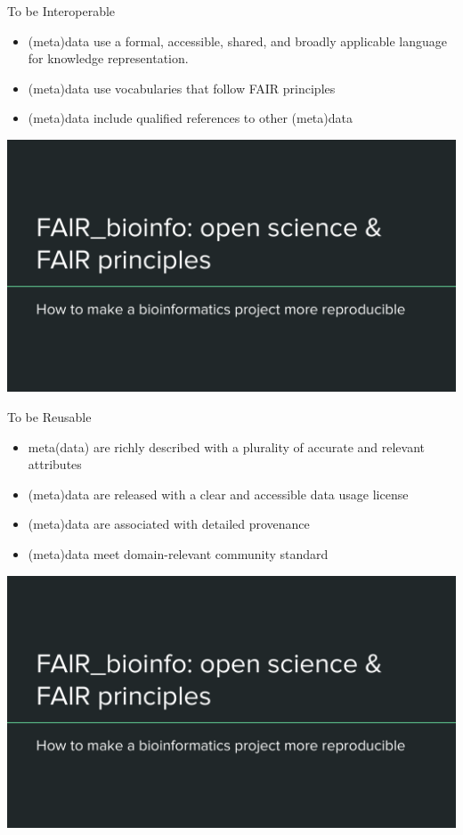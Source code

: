 \begin{frame}
\begin{block}{To be Interoperable}
\begin{itemize}
\item (meta)data use a formal, accessible, shared, and broadly applicable language for knowledge representation.
\item (meta)data use vocabularies that follow FAIR principles
\item (meta)data include qualified references to other (meta)data
\end{itemize}
\end{block}
\end{frame}

\begin{frame}
\includegraphics[page=11,scale=0.55]{01_OS_and_FAIR_intro.pdf}
\end{frame}

\begin{frame}
\begin{block}{To be Reusable}
\begin{itemize}
\item meta(data) are richly described with a plurality of accurate and relevant attributes
\item (meta)data are released with a clear and accessible data usage license
\item (meta)data are associated with detailed provenance
\item (meta)data meet domain-relevant community standard
\end{itemize}
\end{block}
\end{frame}

\begin{frame}
\includegraphics[page=12,scale=0.6]{01_OS_and_FAIR_intro.pdf}
\end{frame}
